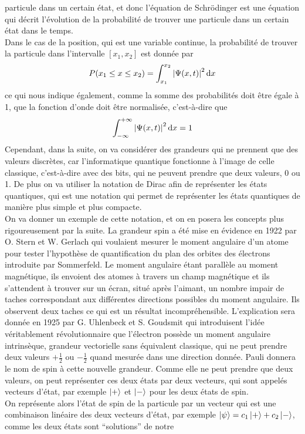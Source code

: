 particule dans un certain état, et donc l'équation de Schrödinger est une équation qui décrit l'évolution de
la probabilité de trouver une particule dans un certain état dans le temps.\\
Dans le cas de la position, qui est une variable continue, la probabilité de trouver la particule dans l'intervalle
$[x_1,x_2]$ est donnée par
\[
    P(x_1 \leq x \leq x_2) = \int_{x_1}^{x_2} \abs{\Psi (x,t)}^2 \dd{x}
\]
ce qui nous indique également, comme la somme des probabilités doit être égale à 1, que la fonction d'onde
doit être normalisée, c'est-à-dire que
\[
    \int_{- \infty}^{+ \infty} \abs{\Psi (x,t)}^2 \dd{x} = 1
\]
Cependant, dans la suite, on va considérer des grandeurs qui ne prennent que des valeurs discrètes, car l'informatique quantique fonctionne à l'image de
celle classique, c'est-à-dire avec des bits, qui ne peuvent prendre que deux valeurs, 0 ou 1.
De plus on va utiliser la notation de Dirac afin de représenter les états quantiques, qui est une notation
qui permet de représenter les états quantiques de manière plus simple et plus compacte.\\
On va donner un exemple de cette notation, et on en posera les concepts plus rigoureusement par la suite.
La grandeur spin a été mise en évidence en 1922 par O. Stern et W. Gerlach qui voulaient mesurer le moment
angulaire d’un atome pour tester l’hypothèse de quantification du plan des orbites des électrons introduite
par Sommerfeld.
Le moment angulaire étant parallèle au moment magnétique, ils envoient des atomes à travers un champ magnétique
et ils s'attendent à trouver sur un écran, situé après l’aimant, un nombre impair de taches correspondant aux
différentes directions possibles du moment angulaire.
Ils observent deux taches ce qui est un résultat incompréhensible.
L’explication sera donnée en 1925 par G. Uhlenbeck et S. Goudsmit qui introduisent l'idée véritablement
révolutionnaire que l’électron possède un moment angulaire intrinsèque, grandeur vectorielle sans équivalent
classique, qui ne peut prendre deux valeurs $+ \frac{1}{2}$ ou $- \frac{1}{2}$ quand mesurée dans une direction donnée.
Pauli donnera le nom de spin à cette nouvelle grandeur.
Comme elle ne peut prendre que deux valeurs, on peut représenter ces deux états par deux vecteurs, qui sont
appelés vecteurs d'état, par exemple $\ket{+}$ et $\ket{-}$ pour les deux états de spin.\\
On représente alors l'état de spin de la particule par un vecteur qui est une combinaison linéaire des deux vecteurs
d'état, par exemple $\ket{\psi} = c_1 \ket{+} + c_2 \ket{-}$, comme les deux états sont ``solutions'' de notre
